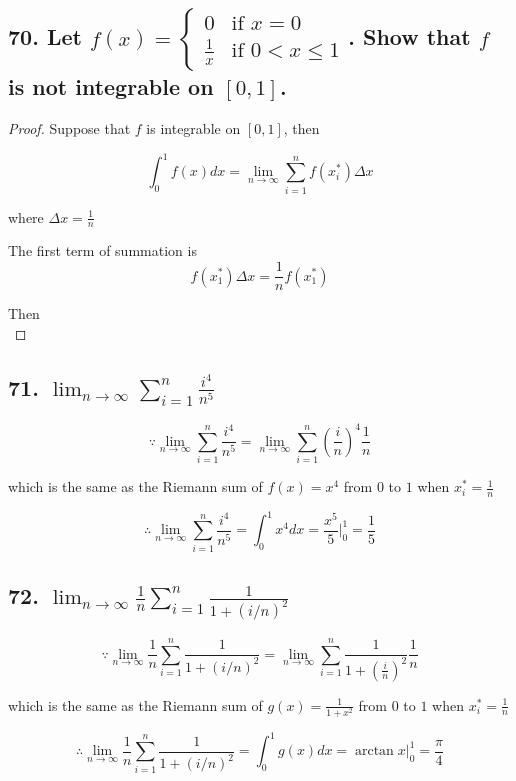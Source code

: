 \documentclass{article}
\begin{document}
    \subsection*{70. Let $f(x) = \left\{ \begin{array}{ll}
        0 & \textrm{if $x = 0$} \\
        \frac 1 x & \textrm{if $0 < x \leq 1$}
    \end{array} \right.$. Show that $f$ is not integrable on $[0, 1]$.}

    \begin{proof}
        Suppose that $f$ is integrable on $[0, 1]$, then 

        $$\int_{0}^{1}f(x)dx = \lim_{n \to \infty}\sum_{i = 1}^{n}f(x_i^*)\Delta x$$

        where $\Delta x = \frac{1}{n}$

        The first term of summation is $$f(x_1^*)\Delta x = \frac 1 nf(x_1^*)$$

        Then $$$$
    \end{proof}

    \subsection*{71. $\lim_{n \to \infty} \sum_{i = 1}^n \frac{i^4}{n^5}$}

    $$\because \lim_{n \to \infty}\sum_{i = 1}^n \frac{i^4}{n^5} = \lim_{n \to \infty}\sum_{i = 1}^n (\frac i n)^4 \frac{1}{n} $$

    which is the same as the Riemann sum of $f(x) = x^4$ from $0$ to $1$ when $x_i^* = \frac 1 n$

    $$\therefore \lim_{n \to \infty}\sum_{i = 1}^n \frac{i^4}{n^5} = \int_0^1x^4dx = \frac{x^5}{5} \biggl |_0^1 = \frac 1 5$$

    \subsection*{72. $\lim_{n \to \infty}\frac 1 n \sum_{i = 1}^n\frac{1}{1 + (i / n)^2}$}

    $$\because \lim_{n \to \infty}\frac 1 n \sum_{i = 1}^n\frac{1}{1 + (i / n)^2} = \lim_{n \to \infty}\sum_{i = 1}^n \frac{1}{1 + (\frac i n)^2} \frac 1 n$$

    which is the same as the Riemann sum of $g(x) = \frac{1}{1 + x^2}$ from $0$ to $1$ when $x_i^* = \frac 1 n$

    $$\therefore \lim_{n \to \infty}\frac 1 n \sum_{i = 1}^n\frac{1}{1 + (i / n)^2} = \int_0^1g(x)dx = \arctan x \biggl | _0^1 = \frac \pi 4$$
\end{document}
